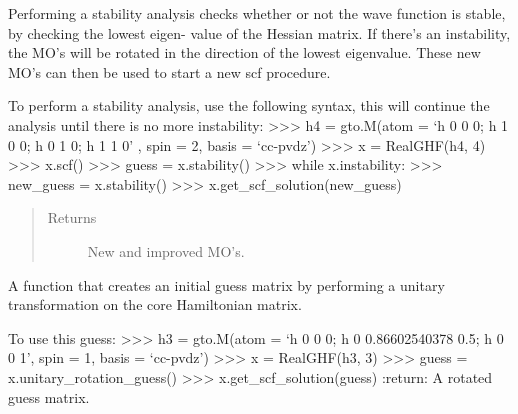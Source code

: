 \documentclass[letterpaper,10pt,english]{sphinxmanual}
\begin{document}
\begin{fulllineitems}
\begin{fulllineitems}
\end{fulllineitems}


\begin{fulllineitems}
\label{\detokenize{real_GHF:ghf.real_GHF.RealGHF.stability}}
Performing a stability analysis checks whether or not the wave function is stable, by checking the lowest eigen-
value of the Hessian matrix. If there’s an instability, the MO’s will be rotated in the direction
of the lowest eigenvalue. These new MO’s can then be used to start a new scf procedure.

To perform a stability analysis, use the following syntax, this will continue the analysis until there is
no more instability:
\textgreater{}\textgreater{}\textgreater{} h4 = gto.M(atom = ‘h 0 0 0; h 1 0 0; h 0 1 0; h 1 1 0’ , spin = 2, basis = ‘cc-pvdz’)
\textgreater{}\textgreater{}\textgreater{} x = RealGHF(h4, 4)
\textgreater{}\textgreater{}\textgreater{} x.scf()
\textgreater{}\textgreater{}\textgreater{} guess = x.stability()
\textgreater{}\textgreater{}\textgreater{} while x.instability:
\textgreater{}\textgreater{}\textgreater{}     new\_guess = x.stability()
\textgreater{}\textgreater{}\textgreater{}     x.get\_scf\_solution(new\_guess)
\begin{quote}\begin{description}
\item[{Returns}] \leavevmode
New and improved MO’s.

\end{description}\end{quote}

\end{fulllineitems}


\begin{fulllineitems}
\label{\detokenize{real_GHF:ghf.real_GHF.RealGHF.unitary_rotation_guess}}
A function that creates an initial guess matrix by performing a unitary transformation on the core Hamiltonian
matrix.

To use this guess:
\textgreater{}\textgreater{}\textgreater{} h3 = gto.M(atom = ‘h 0 0 0; h 0 0.86602540378 0.5; h 0 0 1’, spin = 1, basis = ‘cc-pvdz’)
\textgreater{}\textgreater{}\textgreater{} x = RealGHF(h3, 3)
\textgreater{}\textgreater{}\textgreater{} guess = x.unitary\_rotation\_guess()
\textgreater{}\textgreater{}\textgreater{} x.get\_scf\_solution(guess)
:return: A rotated guess matrix.

\end{fulllineitems}


\end{fulllineitems}
\end{document}
